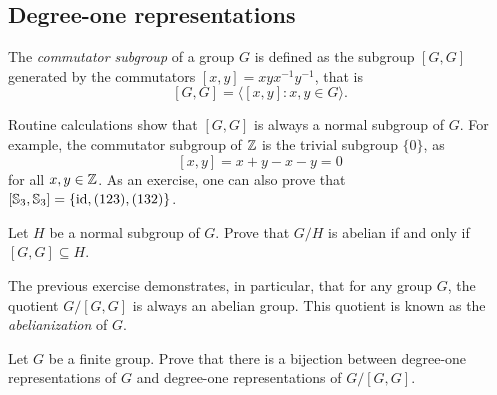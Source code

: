\begin{optional}
\section{Degree-one representations}

The \emph{commutator subgroup} of a group $G$ is defined as the subgroup
$[G,G]$ generated by the commutators $[x,y]=xyx^{-1}y^{-1}$, that is  
 \[
        [G,G]=\langle[x,y]: x,y\in G\rangle.
\]

Routine calculations show that $[G,G]$ is always a normal subgroup of $G$. 
For example, the commutator subgroup of $\mathbb{Z}$ is the trivial subgroup $\{0\}$, 
as 
\[
[x,y]=x+y-x-y=0
\]
for all $x,y\in\mathbb{Z}$. As an exercise, one can also prove that 
$[\mathbb{S}_3,\mathbb{S}_3]=\{\operatorname{id},(123),(132)\}$.

\begin{xca}
\label{xca:commutator}
Let $H$ be a normal subgroup of $G$. Prove that
$G/H$ is abelian if and only if $[G,G]\subseteq H$.
\end{xca}

The previous exercise demonstrates, in particular, that for any group 
$G$, the quotient $G/[G,G]$ is always an abelian group. 
This quotient is known as the \emph{abelianization} of 
$G$. 

\begin{xca}
Let $G$ be a finite group.
Prove that there is a bijection between degree-one representations of $G$ and
degree-one representations of $G/[G,G]$.
\end{xca}
\end{optional}


